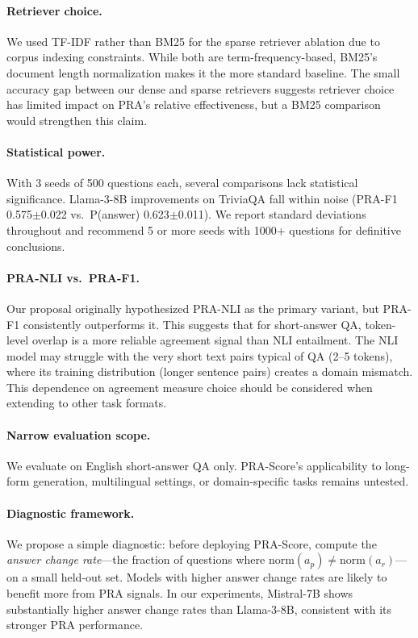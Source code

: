 \documentclass{article}
\begin{document}
\paragraph{Retriever choice.} We used TF-IDF rather than BM25 for the sparse retriever ablation due to corpus indexing constraints. While both are term-frequency-based, BM25's document length normalization makes it the more standard baseline. The small accuracy gap between our dense and sparse retrievers suggests retriever choice has limited impact on PRA's relative effectiveness, but a BM25 comparison would strengthen this claim.

\paragraph{Statistical power.} With 3 seeds of 500 questions each, several comparisons lack statistical significance. Llama-3-8B improvements on TriviaQA fall within noise (PRA-F1 0.575$\pm$0.022 vs.\ P(answer) 0.623$\pm$0.011). We report standard deviations throughout and recommend 5 or more seeds with 1000+ questions for definitive conclusions.

\paragraph{PRA-NLI vs.\ PRA-F1.} Our proposal originally hypothesized PRA-NLI as the primary variant, but PRA-F1 consistently outperforms it. This suggests that for short-answer QA, token-level overlap is a more reliable agreement signal than NLI entailment. The NLI model may struggle with the very short text pairs typical of QA (2--5 tokens), where its training distribution (longer sentence pairs) creates a domain mismatch. This dependence on agreement measure choice should be considered when extending to other task formats.

\paragraph{Narrow evaluation scope.} We evaluate on English short-answer QA only. PRA-Score's applicability to long-form generation, multilingual settings, or domain-specific tasks remains untested.

\paragraph{Diagnostic framework.} We propose a simple diagnostic: before deploying PRA-Score, compute the \emph{answer change rate}---the fraction of questions where $\text{norm}(a_p) \neq \text{norm}(a_r)$---on a small held-out set. Models with higher answer change rates are likely to benefit more from PRA signals. In our experiments, Mistral-7B shows substantially higher answer change rates than Llama-3-8B, consistent with its stronger PRA performance.
\end{document}
